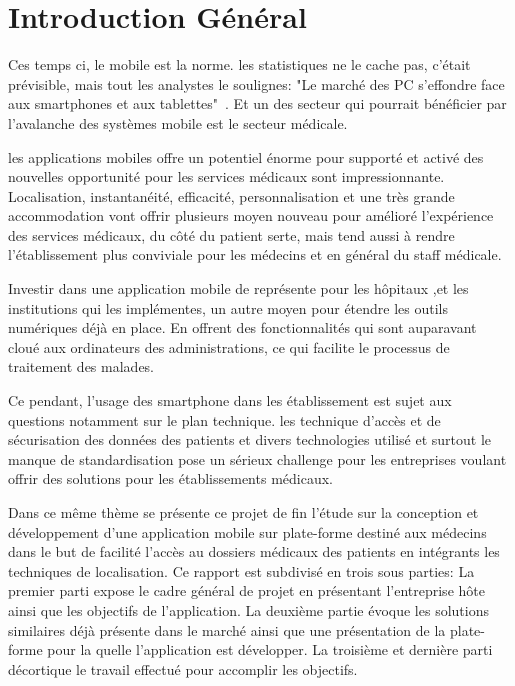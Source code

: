 
\chapter{Introduction Général}

Ces temps ci, le mobile est la norme. les statistiques ne le cache pas, c'était
prévisible, mais tout les analystes le soulignes: "Le marché des PC s'effondre
face aux smartphones et aux tablettes"~\cite{lefigaro}. Et un des secteur qui
pourrait bénéficier par l'avalanche des systèmes mobile est le secteur médicale.

les applications mobiles offre un potentiel énorme pour supporté et activé des
nouvelles opportunité pour les services médicaux sont impressionnante.
Localisation, instantanéité, efficacité, personnalisation et une très grande
accommodation vont offrir plusieurs moyen nouveau pour amélioré l'expérience des
services médicaux, du côté du patient serte, mais tend aussi à rendre
l'établissement plus conviviale pour les médecins et en général du staff
médicale.

Investir dans une application mobile de représente pour les hôpitaux ,et les
institutions qui les implémentes, un autre moyen pour étendre les outils
numériques déjà en place. En offrent des fonctionnalités qui sont auparavant
cloué aux ordinateurs des administrations, ce qui facilite le processus de
traitement des malades.

Ce pendant, l'usage des smartphone dans les établissement est sujet aux
questions notamment sur le plan technique. les technique d'accès et de
sécurisation des données des patients et divers technologies utilisé et surtout
le manque de standardisation pose un sérieux challenge pour les entreprises
voulant offrir des solutions pour les établissements médicaux.

Dans ce même thème se présente ce projet de fin l'étude sur la conception et
développement d'une application mobile sur plate-forme \android destiné aux
médecins dans le but de facilité l'accès au dossiers médicaux des patients en
intégrants les techniques de localisation. Ce rapport est subdivisé en trois
sous parties: La premier parti expose le cadre général de projet en présentant
l'entreprise hôte ainsi que les objectifs de l'application. La deuxième partie
évoque les solutions similaires déjà présente dans le marché ainsi que une
présentation de la plate-forme pour la quelle l'application est développer. La
troisième et dernière parti décortique le travail effectué pour accomplir les
objectifs.
